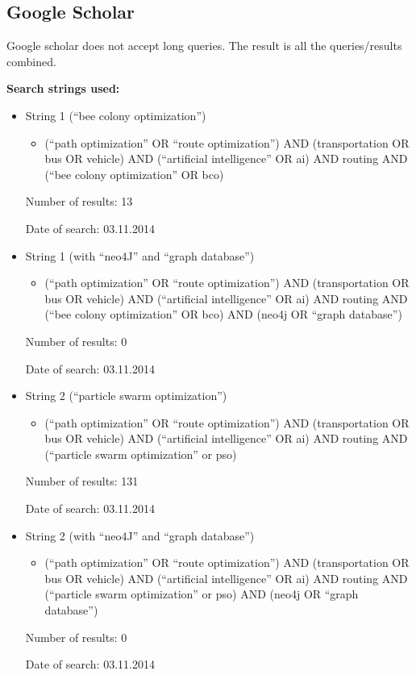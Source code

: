 \subsection{Google Scholar}
Google scholar does not accept long queries. The result is all the queries/results combined.
\par\par
\textbf{Search strings used:}
\begin{itemize}
\item String 1 (``bee colony optimization'')
\begin{itemize}
\item (``path optimization'' OR ``route optimization'') AND (transportation OR bus OR vehicle) AND (``artificial intelligence'' OR ai) AND routing AND (``bee colony optimization'' OR bco)
\end{itemize}
\par
Number of results: 13
\par
Date of search: 03.11.2014
\end{itemize}
\begin{itemize}
\item String 1 (with ``neo4J'' and ``graph database'')
\begin{itemize}
\item (``path optimization'' OR ``route optimization'') AND (transportation OR bus OR vehicle) AND (``artificial intelligence'' OR ai) AND routing AND (``bee colony optimization'' OR bco) AND (neo4j OR ``graph database'')
\end{itemize}
\par
Number of results: 0
\par
Date of search: 03.11.2014
\end{itemize}
\begin{itemize}
\item String 2 (``particle swarm optimization'')
\begin{itemize}
\item (``path optimization'' OR ``route optimization'') AND (transportation OR bus OR vehicle) AND (``artificial intelligence'' OR ai) AND routing AND (``particle swarm optimization'' or pso)
\end{itemize}
\par
Number of results: 131
\par
Date of search: 03.11.2014
\end{itemize}
\begin{itemize}
\item String 2 (with ``neo4J'' and ``graph database'')
\begin{itemize}
\item (``path optimization'' OR ``route optimization'') AND (transportation OR bus OR vehicle) AND (``artificial intelligence'' OR ai) AND routing AND (``particle swarm optimization'' or pso) AND (neo4j OR ``graph database'')
\end{itemize}
\par
Number of results: 0
\par
Date of search: 03.11.2014
\end{itemize}
